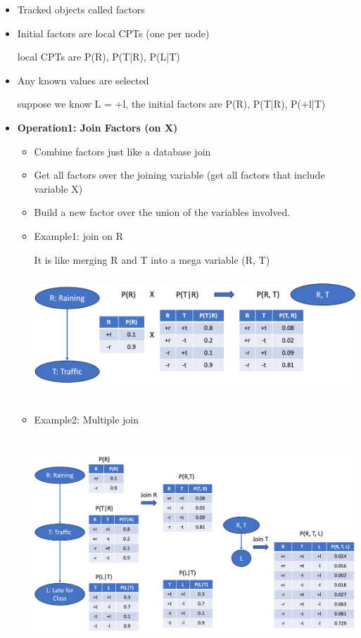 \documentclass[11pt,a4paper]{report}
\begin{document}
\begin{itemize}
    \item Tracked objects called factors
    \item Initial factors are local CPTs (one per node)
    
    local CPTs are P(R), P(T|R), P(L|T)

    \item Any known values are selected

    suppose we know L = +l, the initial factors are P(R), P(T|R), P(+l|T)

    \item \textbf{Operation1: Join Factors (on X)}

        \begin{itemize}
            \item Combine factors just like a database join
            \item Get all factors over the joining variable (get all factors that include variable X)
            \item Build a new factor over the union of the variables involved.
            \item Example1: join on R
            
            It is like merging R and T into a mega variable (R, T)\\

            \includegraphics[width=15cm, height = 5cm]{op1_join.png}

            \item Example2: Multiple join
            
            \includegraphics[width=16cm, height = 8cm]{op1_mul.png}
        \end{itemize}
    

\end{itemize}
\end{document}
